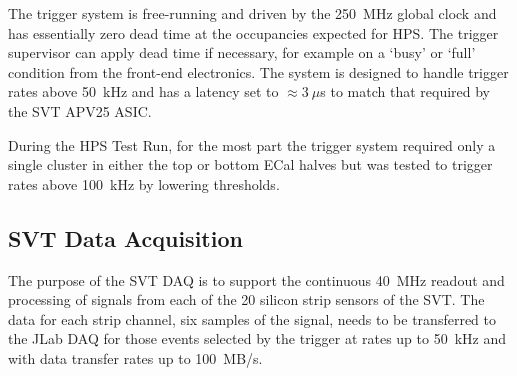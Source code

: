 \documentclass[final,3p,times,twocolumn]{elsarticle}
\begin{document}
The trigger system is free-running and driven by the 250~MHz global clock and has essentially zero 
dead time at the occupancies expected for HPS. The trigger supervisor can apply dead time if 
necessary, for example on a `busy' or `full' condition from the front-end electronics. The system is 
designed to handle trigger rates above 50~kHz and has a latency set to $\approx 3~\mu$s to match 
that required by the SVT APV25 ASIC. 

During the HPS Test Run, for the most part the trigger system 
required only a single cluster in either the top or bottom ECal halves but was tested to trigger rates 
above 100~kHz by lowering thresholds.  



\subsection{SVT Data Acquisition}
\label{sec:svt_daq}
The purpose of the SVT DAQ is to support the continuous 40~MHz readout and processing of signals from 
each of the 20 silicon strip sensors of the SVT. The data for each strip channel, six samples of the 
signal, needs to be transferred to the JLab DAQ for those events selected by the trigger at rates 
up to 50~kHz and with data transfer rates up to 100~MB/s.
\end{document}
